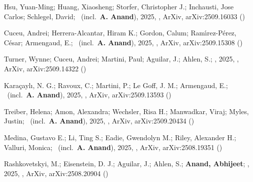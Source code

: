 \item[{\color{numcolor}\scriptsize13}] Hsu, Yuan-Ming; Huang, Xiaosheng; Storfer, Christopher J.; Inchausti, Jose Carlos; Schlegel, David; \etal\ (incl.\ \textbf{A. Anand}), 2025, , ArXiv, arXiv:2509.16033 ()

\item[{\color{numcolor}\scriptsize12}] Cuceu, Andrei; Herrera-Alcantar, Hiram K.; Gordon, Calum; Ram{\'\i}rez-P{\'e}rez, C{\'e}sar; Armengaud, E.; \etal\ (incl.\ \textbf{A. Anand}), 2025, , ArXiv, arXiv:2509.15308 ()

\item[{\color{numcolor}\scriptsize11}] Turner, Wynne; Cuceu, Andrei; Martini, Paul; Aguilar, J.; Ahlen, S.; \etal, 2025, , ArXiv, arXiv:2509.14322 ()

\item[{\color{numcolor}\scriptsize10}] Kara{\c{c}}ayl{\i}, N. G.; Ravoux, C.; Martini, P.; Le Goff, J. M.; Armengaud, E.; \etal\ (incl.\ \textbf{A. Anand}), 2025, , ArXiv, arXiv:2509.13593 ()

\item[{\color{numcolor}\scriptsize9}] Treiber, Helena; Amon, Alexandra; Wechsler, Risa H.; Manwadkar, Viraj; Myles, Justin; \etal\ (incl.\ \textbf{A. Anand}), 2025, , ArXiv, arXiv:2509.20434 ()

\item[{\color{numcolor}\scriptsize8}] Medina, Gustavo E.; Li, Ting S.; Eadie, Gwendolyn M.; Riley, Alexander H.; Valluri, Monica; \etal\ (incl.\ \textbf{A. Anand}), 2025, , ArXiv, arXiv:2508.19351 ()

\item[{\color{numcolor}\scriptsize7}] Rashkovetskyi, M.; Eisenstein, D. J.; Aguilar, J.; Ahlen, S.; \textbf{Anand, Abhijeet}; \etal, 2025, , ArXiv, arXiv:2508.20904 ()

